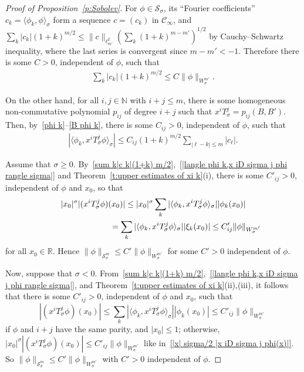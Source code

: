 \documentclass[11pt]{article}
\newcommand{\R}{\mathbb{R}}
\newcommand{\N}{\mathbb{N}}
\newcommand{\CC}{\mathcal{C}}
\renewcommand{\SS}{\mathcal{S}}
\begin{document}
\begin{proof}[Proof of Proposition~\ref{p:Sobolev}]
  For $\phi\in\SS_\sigma$, its ``Fourier coef\/f\/icients'' $c_k=\langle\phi_k,\phi\rangle_\sigma$ form a sequence $c=(c_k)$ in $\CC_\infty$, and $\sum_k|c_k| (1+k)^{m/2}\le\|c\|_{\ell^2_{m'}}(\sum_k(1+k)^{m-m'})^{1/2}$ by Cauchy--Schwartz inequality, where the last series is convergent since $m-m'<-1$. Therefore there is some $C>0$, independent of $\phi$, such that
    \begin{gather}\label{sum k|c k|(1+k) m/2}
      \sum_k|c_k| (1+k)^{m/2}\le C \|\phi\|_{W_\sigma^{m'}} .
    \end{gather}

  On the other hand, for all $i,j\in\N$ with $i+j\le m$, there is some homogeneous non-commutative polynomial $p_{ij}$ of degree $i+j$ such that $x^iT_\sigma^j=p_{ij}(B,B')$. Then, by~\eqref{phi k}--\eqref{B phi k}, there is some $C_{ij}>0$, independent of $\phi$, such that
    \begin{gather}\label{|langle phi k,x iD sigma j phi rangle sigma|}
      |\langle\phi_k,x^iT_\sigma^j\phi\rangle_\sigma|\le C_{ij}(1+k)^{m/2}\sum_{|\ell-k|\le m}|c_\ell| .
    \end{gather}

 Assume that $\sigma\ge0$. By~\eqref{sum k|c k|(1+k) m/2},~\eqref{|langle phi k,x iD sigma j phi rangle sigma|} and Theorem~\ref{t:upper estimates of xi k}(i), there is some $C'_{ij}>0$, independent of $\phi$ and $x_0$, so that
    \begin{gather}
      |x_0|^\sigma |(x^iT_\sigma^j\phi)(x_0)|\le |x_0|^\sigma\sum_k|\langle\phi_k,x^iT_\sigma^j\phi\rangle_\sigma| |\phi_k(x_0)|\nonumber\\
 \hphantom{|x_0|^\sigma |(x^iT_\sigma^j\phi)(x_0)|}{}
      =\sum_k|\langle\phi_k,x^iT_\sigma^j\phi\rangle_\sigma| |\xi_k(x_0)|\le C'_{ij} \|\phi\|_{W_\sigma^{m'}}\label{|x| sigma/2 |x iD sigma j phi(x)|}
    \end{gather}
  for all $x_0\in\R$. Hence $\|\phi\|_{\SS_\sigma^m}\le C'\|\phi\|_{W_\sigma^{m'}}$ for some $C'>0$ independent of $\phi$.

  Now, suppose that  $\sigma<0$. From~\eqref{sum k|c k|(1+k) m/2},~\eqref{|langle phi k,x iD sigma j phi rangle sigma|}, and Theorem~\ref{t:upper estimates of xi k}(ii),(iii), it follows that there is some $C'_{ij}>0$, independent of $\phi$ and $x_0$, such that
    \[
      |(x^iT_\sigma^j\phi)(x_0)|\le\sum_k|\langle\phi_k,x^iT_\sigma^j\phi\rangle_\sigma| |\phi_k(x_0)|
      \le C'_{ij} \|\phi\|_{W_\sigma^{m'}}
    \]
  if $\phi$ and $i+j$ have the same parity, and $|x_0|\le1$; otherwise, $|x_0|^\sigma |(x^iT_\sigma^j\phi)(x_0)|\le C'_{ij} \|\phi\|_{W_\sigma^{m'}}$ like in~\eqref{|x| sigma/2 |x iD sigma j phi(x)|}. So $\|\phi\|_{\SS_ \sigma ^m}\le C'\|\phi\|_{W_\sigma^{m'}}$ with $C'>0$ independent of $\phi$.
\end{proof}
\end{document}
